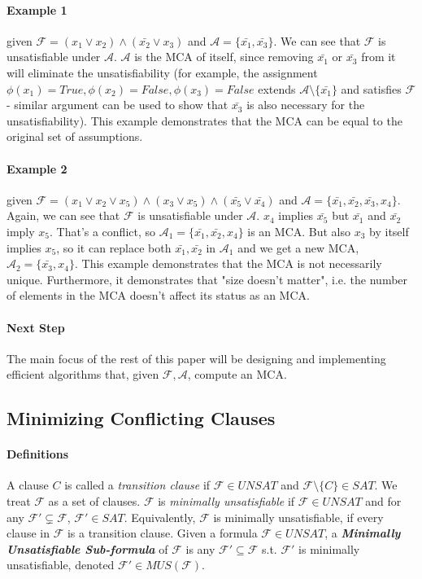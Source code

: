 \documentclass[]{article}
\begin{document}
	\paragraph{Example 1 } given  $\mathcal{F} = (x_1 \lor x_2) \land (\bar{x_2} \lor x_3)$ and $\mathcal{A} =\{\bar{x_1}, \bar{x_3}\}$. We can see that $ \mathcal{F} $ is unsatisfiable under $ \mathcal{A} $. $ \mathcal{A} $ is the MCA of itself, since removing $\bar{x_1}$ or $\bar{x_3}$ from it will eliminate the unsatisfiability (for example, the assignment $ \phi(x_1)=True,\phi(x_2)=False, \phi(x_3)=False $ extends $ \mathcal{A} \setminus \{\bar{x_1}\} $ and satisfies $\mathcal{F}$ - similar argument can be used to show that $\bar{x_3}$ is also necessary for the unsatisfiability). This example demonstrates that the MCA can be equal to the original set of assumptions.
	\paragraph{Example 2 } given  $\mathcal{F} = (x_1 \lor x_2 \lor x_5) \land (x_3 \lor x_5) \land (\bar{x_5} \lor \bar{x_4})$ and $\mathcal{A} =\{\bar{x_1}, \bar{x_2}, \bar{x_3}, x_4\}$. Again, we can see that $ \mathcal{F} $ is unsatisfiable under $ \mathcal{A} $. $ x_4 $ implies $ \bar{x_5} $ but $\bar{x_1}$ and $ \bar{x_2}$ imply $ x_5 $. That's a conflict, so $\mathcal{A}_1 =\{\bar{x_1}, \bar{x_2}, x_4\}$ is an MCA. But also $ x_3 $ by itself implies $ x_5 $, so it can replace both $ \bar{x_1}, \bar{x_2} $ in $ \mathcal{A}_1 $ and we get a new MCA, $\mathcal{A}_2 =\{\bar{x_3}, x_4\}$. 
	This example demonstrates that the MCA is not necessarily unique. Furthermore, it demonstrates that "size doesn't matter", i.e. the number of elements in the MCA doesn't affect its status as an MCA.
	
	\paragraph{Next Step} The main focus of the rest of this paper will be designing and implementing efficient algorithms that, given $\mathcal{F}, \mathcal{A}$, compute an MCA.
	
	\subsection[Similar Problem]{Minimizing Conflicting Clauses}
	\paragraph{Definitions} A clause $ C $ is called a \textit{transition clause} if $ \mathcal{F} \in UNSAT$ and $ \mathcal{F} \setminus \{C\} \in SAT $.
	We treat $ \mathcal{F} $ as a set of clauses. $ \mathcal{F} $ is \textit{minimally unsatisfiable} if $ \mathcal{F} \in UNSAT $ and for any $ \mathcal{F}' \subsetneq \mathcal{F} $, $ \mathcal{F}' \in SAT$. Equivalently, $ \mathcal{F} $ is minimally unsatisfiable, if every clause in $ \mathcal{F} $ is a transition clause. Given a formula $ \mathcal{F} \in UNSAT $, a \textbf{\textit{Minimally Unsatisfiable Sub-formula}} of $ \mathcal{F} $ is any $ \mathcal{F}' \subseteq \mathcal{F} $ s.t. $ \mathcal{F}' $ is minimally unsatisfiable, denoted $ \mathcal{F}' \in MUS(\mathcal{F}) $.
\end{document}
